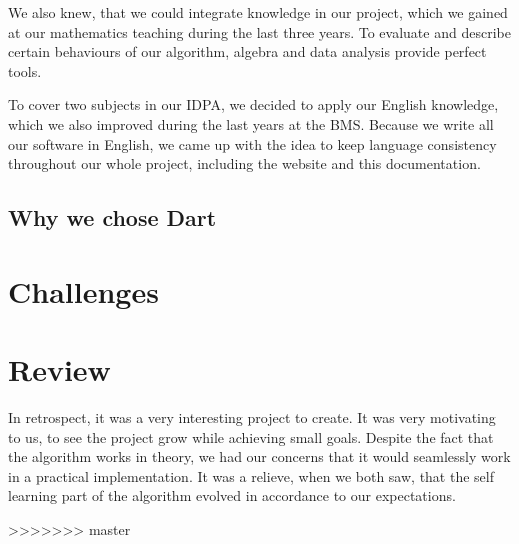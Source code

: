We also knew, that we could integrate knowledge in our project, which we gained at our mathematics teaching during the last three years. To evaluate and describe certain behaviours of our algorithm, algebra and data analysis provide perfect tools.

To cover two subjects in our IDPA, we decided to apply our English knowledge, which we also improved during the last years at the BMS. Because we write all our software in English, we came up with the idea to keep language consistency throughout our whole project, including the website and this documentation.

\subsection{Why we chose Dart}


\section{Challenges}


\section{Review}
In retrospect, it was a very interesting project to create. It was very motivating to us, to see the project grow while achieving small goals. Despite the fact that the algorithm works in theory, we had our concerns that it would seamlessly work in a practical implementation. It was a relieve, when we both saw, that the self learning part of the algorithm evolved in accordance to our expectations.

>>>>>>> master

